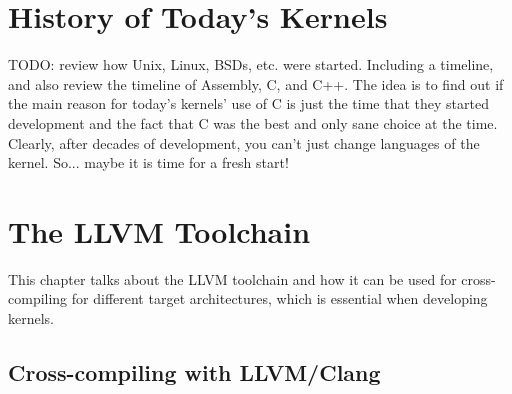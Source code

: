 \documentclass[a4paper,12pt,twoside]{book}
\begin{document}
    \chapter{History of Today's Kernels}
        TODO: review how Unix, Linux, BSDs, etc. were started. Including a timeline, and also review the timeline of Assembly, C, and C++. The idea is to find out if the main reason for today's kernels' use of C is just the time that they started development and the fact that C was the best and only sane choice at the time. Clearly, after decades of development, you can't just change languages of the kernel. So... maybe it is time for a fresh start!

    \chapter{The LLVM Toolchain}
        This chapter talks about the LLVM toolchain and how it can be used for cross-compiling for different target architectures, which is essential when developing kernels.
    
    \section{Cross-compiling with LLVM/Clang}
\end{document}
